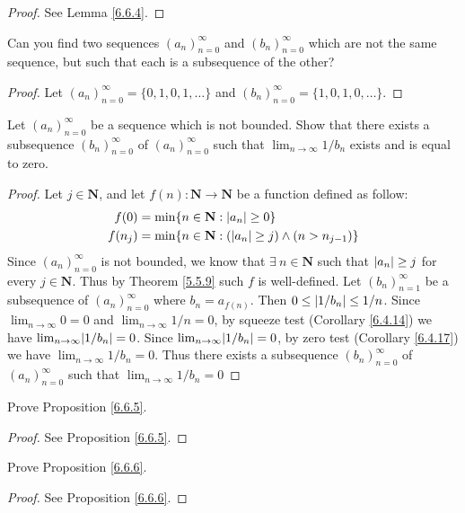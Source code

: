 \begin{proof}
    See Lemma \ref{6.6.4}.
\end{proof}

\begin{exercise}\label{ex 6.6.2}
    Can you find two sequences \((a_n)_{n = 0}^\infty\) and \((b_n)_{n = 0}^\infty\) which are not the same sequence, but such that each is a subsequence of the other?
\end{exercise}

\begin{proof}
    Let \((a_n)_{n = 0}^\infty = \{0, 1, 0, 1, \dots\}\) and \((b_n)_{n = 0}^\infty = \{1, 0, 1, 0, \dots\}\).
\end{proof}

\begin{exercise}\label{ex 6.6.3}
    Let \((a_n)_{n = 0}^\infty\) be a sequence which is not bounded.
    Show that there exists a subsequence \((b_n)_{n = 0}^\infty\) of \((a_n)_{n = 0}^\infty\) such that \(\lim_{n \to \infty} 1 / b_n\) exists and is equal to zero.
\end{exercise}

\begin{proof}
    Let \(j \in \mathbf{N}\), and let \(f(n) : \mathbf{N} \to \mathbf{N}\) be a function defined as follow:
    \begin{align*}
        f(0)   & = \min\{n \in \mathbf{N} : \abs*{a_n} \geq 0\}                         \\
        f(n_j) & = \min\{n \in \mathbf{N} : (\abs*{a_n} \geq j) \land (n > n_{j - 1})\}
    \end{align*}
    Since \((a_n)_{n = 0}^\infty\) is not bounded, we know that \(\exists\ n \in \mathbf{N}\) such that \(\abs*{a_n} \geq j\) for every \(j \in \mathbf{N}\).
    Thus by Theorem \ref{5.5.9} such \(f\) is well-defined.
    Let \((b_n)_{n = 1}^\infty\) be a subsequence of \((a_n)_{n = 0}^\infty\) where \(b_n = a_{f(n)}\).
    Then \(0 \leq \abs*{1 / b_n} \leq 1 / n\).
    Since \(\lim_{n \to \infty} 0 = 0\) and \(\lim_{n \to \infty} 1 / n = 0\), by squeeze test (Corollary \ref{6.4.14}) we have \(\lim_{n \to \infty} \abs*{1 / b_n} = 0\).
    Since \(\lim_{n \to \infty} \abs*{1 / b_n} = 0\), by zero test (Corollary \ref{6.4.17}) we have \(\lim_{n \to \infty} 1 / b_n = 0\).
    Thus there exists a subsequence \((b_n)_{n = 0}^\infty\) of \((a_n)_{n = 0}^\infty\) such that \(\lim_{n \to \infty} 1 / b_n = 0\)
\end{proof}

\begin{exercise}\label{ex 6.6.4}
    Prove Proposition \ref{6.6.5}.
\end{exercise}

\begin{proof}
    See Proposition \ref{6.6.5}.
\end{proof}

\begin{exercise}\label{ex 6.6.5}
    Prove Proposition \ref{6.6.6}.
\end{exercise}

\begin{proof}
    See Proposition \ref{6.6.6}.
\end{proof}